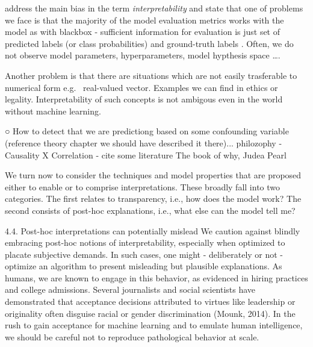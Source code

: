 \citet{Montavon2018} address the main bias in the term \emph{interpretability} and state that one of problems we face is that the majority of the model evaluation metrics works with the model as with blackbox - sufficient information for evaluation is just set of predicted labels (or class probabilities) and ground-truth labels . Often, we do not observe model parameters, hyperparameters, model hypthesis space \dots. 

Another problem is that there are situations which are not easily trasferable to numerical form e.g. \ real-valued vector. Examples we can find in ethics or legality. Interpretability of such concepts is not ambigous even in the world without machine learning.



○ How to detect that we are predictiong based on some confounding variable (reference theory chapter we should have described it there)...
philozophy - Causality X Correlation - cite some literature
The book of why, Judea Pearl


    We turn now to consider the techniques and model properties that are proposed either to enable or to comprise interpretations. These broadly fall into two categories. The first
    relates to transparency, i.e., how does the model work? The
    second consists of post-hoc explanations, i.e., what else
    can the model tell me? 


    4.4. Post-hoc interpretations can potentially mislead
    We caution against blindly embracing post-hoc notions of
    interpretability, especially when optimized to placate subjective demands. In such cases, one might - deliberately or
    not - optimize an algorithm to present misleading but plausible explanations. As humans, we are known to engage in
    this behavior, as evidenced in hiring practices and college
    admissions. Several journalists and social scientists have
    demonstrated that acceptance decisions attributed to virtues
    like leadership or originality often disguise racial or gender
    discrimination (Mounk, 2014). In the rush to gain acceptance for machine learning and to emulate human intelligence, we should be careful not to reproduce pathological
    behavior at scale.

